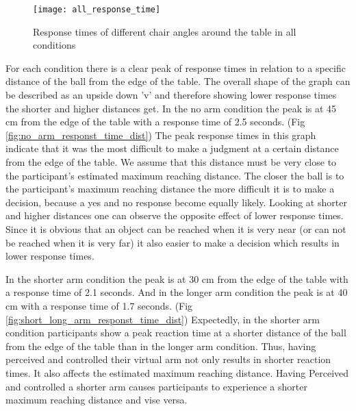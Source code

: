 \begin{figure}
\centering
  \texttt{[image: all\_response\_time]}
  \caption{Response times of different chair angles around the table in all conditions} 
  \label{fig:all_response_time}
\end{figure}

For each condition there is a clear peak of response times in relation to a specific distance of the ball from the edge of the table. The overall shape of the graph can be described as an upside down 'v' and therefore showing lower response times the shorter and higher distances get. In the no arm condition the peak is at 45 cm from the edge of the table with a response time of 2.5 seconds. (Fig \ref{fig:no_arm_responst_time_dist}) The peak response times in this graph indicate that it was the most difficult to make a judgment at a certain distance from the edge of the table. We assume that this distance must be very close to the participant's estimated maximum reaching distance. The closer the ball is to the participant's maximum reaching distance the more difficult it is to make a decision, because a yes and no response become equally likely.
Looking at shorter and higher distances one can observe the opposite effect of lower response times. Since it is obvious that an object can be reached when it is very near (or can not be reached when it is very far) it also easier to make a decision which results in lower response times. 

In the shorter arm condition the peak is at 30 cm from the edge of the table with a response time of 2.1 seconds. And in the longer arm condition the peak is at 40 cm with a response time of 1.7 seconds. (Fig \ref{fig:short_long_arm_responst_time_dist}) Expectedly, in the shorter arm condition participants show a peak reaction time at a shorter distance of the ball from the edge of the table than in the longer arm condition. Thus, having perceived and controlled their virtual arm not only results in shorter reaction times. It also affects the estimated maximum reaching distance. Having Perceived and controlled a shorter arm causes participants to experience a shorter maximum reaching distance and vise versa. 

